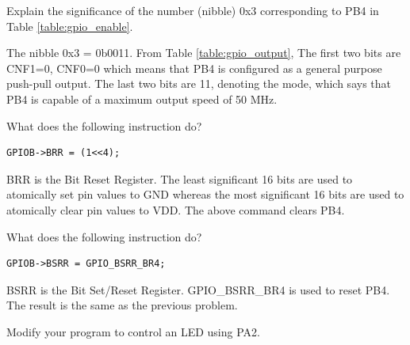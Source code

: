 \documentclass[journal,12pt,twocolumn]{IEEEtran}
\begin{document}
\begin{table}[!h]
\centering
\small

\caption{}
\label{table:gpio_enable}
\end{table}
\begin{problem}
Explain the significance of the number (nibble) 0x3 corresponding to PB4 in Table \ref{table:gpio_enable}.
\end{problem}
\solution The nibble 0x3 = 0b0011.  From Table \ref{table:gpio_output},   The first two bits are CNF1=0, CNF0=0 which
means that PB4 is configured as a general purpose push-pull output. The last two bits are 11, denoting the mode, which
says that PB4 is  capable of a maximum output speed of 50 MHz.   
\begin{table}[!h]
\centering
\small

\caption{}
\label{table:gpio_output}
\end{table}
\begin{problem}
What does the following instruction do?
\begin{lstlisting}
GPIOB->BRR = (1<<4);
\end{lstlisting}
\end{problem}
\solution BRR is the Bit Reset Register.  The least significant 16 bits are used to atomically set pin values to GND whereas the most significant 16 bits are used to atomically clear pin values to VDD. The above command clears PB4.  
\begin{problem}
What does the following instruction do?
\begin{lstlisting}
GPIOB->BSRR = GPIO_BSRR_BR4;
\end{lstlisting}
\end{problem}
\solution BSRR is the Bit Set/Reset Register.  GPIO\_BSRR\_BR4 is used to reset PB4.  The result is the same as the previous problem.
\begin{problem}
Modify your program to control an LED using PA2.
\end{problem}
\end{document}
